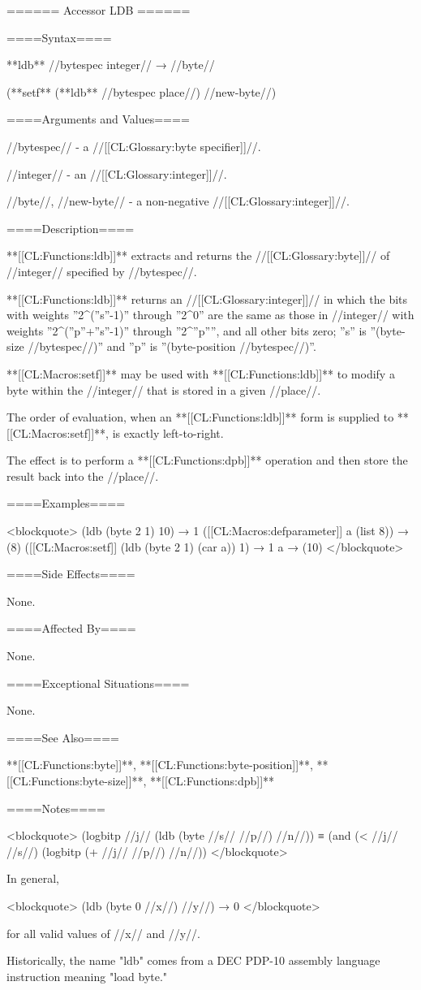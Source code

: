 ====== Accessor LDB ======

====Syntax====

**ldb** //bytespec integer// → //byte//

(**setf** (**ldb** //bytespec place//) //new-byte//)

====Arguments and Values====

//bytespec// - a //[[CL:Glossary:byte specifier]]//.

//integer// - an //[[CL:Glossary:integer]]//.

//byte//, //new-byte// - a non-negative //[[CL:Glossary:integer]]//.

====Description====

**[[CL:Functions:ldb]]** extracts and returns the //[[CL:Glossary:byte]]// of //integer// specified by //bytespec//.

**[[CL:Functions:ldb]]** returns an //[[CL:Glossary:integer]]// in which the bits with weights ''2^{(''s''-1)}'' through ''2^{0}'' are the same as those in //integer// with weights ''2^{(''p''+''s''-1)}'' through ''2^''p'''', and all other bits zero; ''s'' is ''(byte-size //bytespec//)'' and ''p'' is ''(byte-position //bytespec//)''.

**[[CL:Macros:setf]]** may be used with **[[CL:Functions:ldb]]** to modify a byte within the //integer// that is stored in a given //place//.

The order of evaluation, when an **[[CL:Functions:ldb]]** form is supplied to **[[CL:Macros:setf]]**, is exactly left-to-right. 

The effect is to perform a **[[CL:Functions:dpb]]** operation and then store the result back into the //place//.

====Examples====

<blockquote> (ldb (byte 2 1) 10) → 1 ([[CL:Macros:defparameter]] a (list 8)) → (8) ([[CL:Macros:setf]] (ldb (byte 2 1) (car a)) 1) → 1 a → (10) </blockquote>

====Side Effects====

None.

====Affected By====

None.

====Exceptional Situations====

None.

====See Also====

**[[CL:Functions:byte]]**, **[[CL:Functions:byte-position]]**, **[[CL:Functions:byte-size]]**, **[[CL:Functions:dpb]]**

====Notes====

<blockquote> (logbitp //j// (ldb (byte //s// //p//) //n//)) ≡ (and (< //j// //s//) (logbitp (+ //j// //p//) //n//)) </blockquote>

In general,

<blockquote> (ldb (byte 0 //x//) //y//) → 0 </blockquote>

for all valid values of //x// and //y//.

Historically, the name "ldb" comes from a DEC PDP-10 assembly language instruction meaning "load byte."

